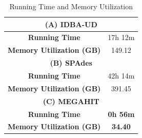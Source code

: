\documentclass[10pt,a4paper,twocolumn]{article}
\begin{document}
 \begin{table}[h]
\caption{Running Time and Memory Utilization}
\centering
\begin{tabular}{|c|c|}
\hline
\multicolumn{2}{|c|}{ \textbf{(A) IDBA-UD}}    \\ [0.5ex] %
\hline
\textbf{Running Time}& 17h 12m \\ 
\hline
\textbf{Memory Utilization (GB)}&149.12\\ 
\hline
\multicolumn{2}{|c|}{ \textbf{(B) SPAdes} }   \\ [0.5ex] %
\hline
\textbf{Running Time} & 42h 14m    \\
\hline
\textbf{Memory Utilization (GB)}& 391.45   \\ 
\hline
\multicolumn{2}{|c|}{ \textbf{(C) MEGAHIT} }    \\ [0.5ex] %
\hline
\textbf{Running Time}& {\bf 0h 56m} \\
\hline
\textbf{Memory Utilization (GB)}& {\bf 34.40} \\ 
\hline

\end{tabular}
\label{table:time-memory}
\end{table}
\end{document}
